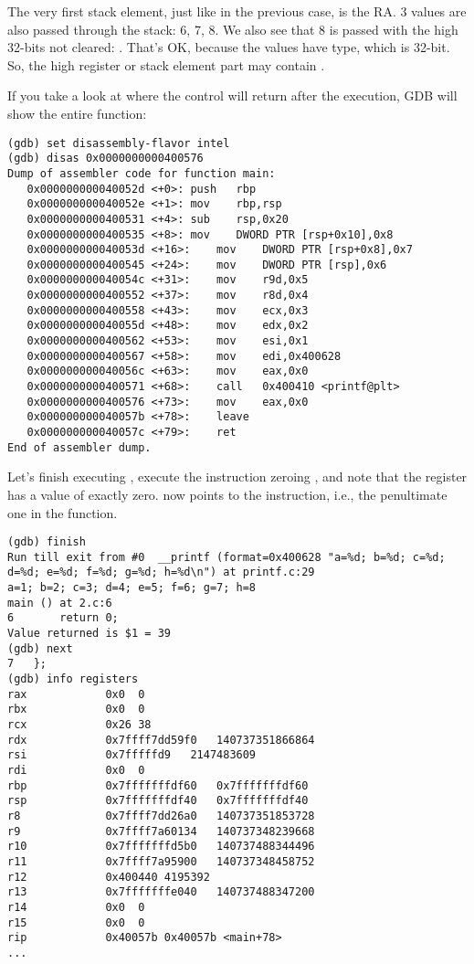 The very first stack element, just like in the previous case, is the \ac{RA}.
3 values are also passed through the stack: 6, 7, 8.
We also see that 8 is passed with the high 32-bits not cleared: .
That's OK, because the values have \Tint type, which is 32-bit.
So, the high register or stack element part may contain .

If you take a look at where the control will return after the \printf execution,
\ac{GDB} will show the entire \main function:

\begin{lstlisting}[style=customasmx86]
(gdb) set disassembly-flavor intel
(gdb) disas 0x0000000000400576
Dump of assembler code for function main:
   0x000000000040052d <+0>:	push   rbp
   0x000000000040052e <+1>:	mov    rbp,rsp
   0x0000000000400531 <+4>:	sub    rsp,0x20
   0x0000000000400535 <+8>:	mov    DWORD PTR [rsp+0x10],0x8
   0x000000000040053d <+16>:	mov    DWORD PTR [rsp+0x8],0x7
   0x0000000000400545 <+24>:	mov    DWORD PTR [rsp],0x6
   0x000000000040054c <+31>:	mov    r9d,0x5
   0x0000000000400552 <+37>:	mov    r8d,0x4
   0x0000000000400558 <+43>:	mov    ecx,0x3
   0x000000000040055d <+48>:	mov    edx,0x2
   0x0000000000400562 <+53>:	mov    esi,0x1
   0x0000000000400567 <+58>:	mov    edi,0x400628
   0x000000000040056c <+63>:	mov    eax,0x0
   0x0000000000400571 <+68>:	call   0x400410 <printf@plt>
   0x0000000000400576 <+73>:	mov    eax,0x0
   0x000000000040057b <+78>:	leave  
   0x000000000040057c <+79>:	ret    
End of assembler dump.
\end{lstlisting}

Let's finish executing \printf, execute the instruction
zeroing \EAX, and note that the \EAX register has a value of exactly zero.
\RIP now points to the  instruction, i.e., the penultimate one in the \main function.

\begin{lstlisting}
(gdb) finish
Run till exit from #0  __printf (format=0x400628 "a=%d; b=%d; c=%d; d=%d; e=%d; f=%d; g=%d; h=%d\n") at printf.c:29
a=1; b=2; c=3; d=4; e=5; f=6; g=7; h=8
main () at 2.c:6
6		return 0;
Value returned is $1 = 39
(gdb) next
7	};
(gdb) info registers
rax            0x0	0
rbx            0x0	0
rcx            0x26	38
rdx            0x7ffff7dd59f0	140737351866864
rsi            0x7fffffd9	2147483609
rdi            0x0	0
rbp            0x7fffffffdf60	0x7fffffffdf60
rsp            0x7fffffffdf40	0x7fffffffdf40
r8             0x7ffff7dd26a0	140737351853728
r9             0x7ffff7a60134	140737348239668
r10            0x7fffffffd5b0	140737488344496
r11            0x7ffff7a95900	140737348458752
r12            0x400440	4195392
r13            0x7fffffffe040	140737488347200
r14            0x0	0
r15            0x0	0
rip            0x40057b	0x40057b <main+78>
...
\end{lstlisting}
